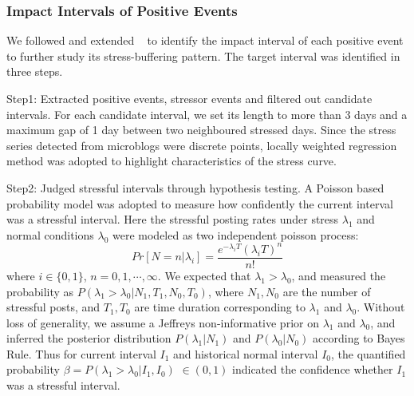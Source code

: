 \subsubsection{Impact Intervals of Positive Events}
\label{subsec:interval}
We followed and extended ~\citep{Li2017Analyzing} to identify the impact interval of each positive event to further study its stress-buffering pattern.
The target interval was identified in three steps.

Step1:
Extracted positive events, stressor events and filtered out candidate intervals.
For each candidate interval,
we set its length to more than 3 days and a maximum gap of 1 day between two neighboured stressed days.
Since the stress series detected from microblogs were discrete points,
locally weighted regression ~\citep{Cleveland1988Locally} method was adopted to highlight characteristics of the stress curve.

Step2: Judged stressful intervals through hypothesis testing.
A Poisson based probability model was adopted to measure how confidently the current interval was a stressful interval.
Here the stressful posting rates under stress $\lambda_1$ and normal conditions $\lambda_0$ were modeled as two independent poisson process:
\begin{equation}
Pr[N=n|\lambda_i]=\frac{e^{-\lambda_i T}{(\lambda_i T)}^n}{n!}
\end{equation}
where $i\in\{0,1\}$, $n=0,1,\cdots,\infty$.
We expected that $\lambda_1 > \lambda_0$, and measured the probability as $P(\lambda_1>\lambda_0|N_1, T_1, N_0, T_0)$,
where $N_1, N_0$ are the number of stressful posts, and $T_1, T_0$ are time duration corresponding to $\lambda_1$ and $\lambda_0$.
Without loss of generality, we assume a Jeffreys non-informative prior on $\lambda_1$ and $\lambda_0$,
and inferred the posterior distribution $P(\lambda_1|N_1)$ and $P(\lambda_0|N_0)$ according to Bayes Rule.
Thus for current interval $I_1$ and historical normal interval $I_0$,
the quantified probability $\beta = P(\lambda_1>\lambda_0|I_1,I_0)$ $\in (0,1)$ indicated the confidence
whether $I_1$ was a stressful interval.


